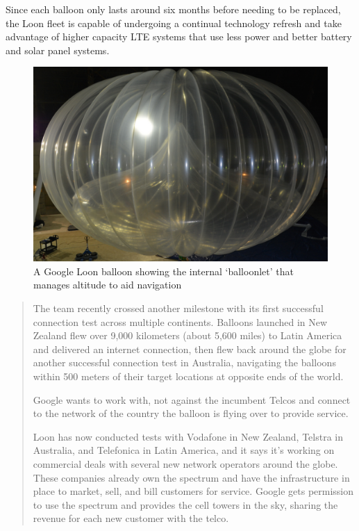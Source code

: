 Since each balloon only lasts around six months before needing to be replaced, the Loon fleet is capable of undergoing a continual technology refresh and take advantage of higher capacity LTE systems that use less power and better battery and solar panel systems.
\begin{figure}[ht]
\centering
\includegraphics[scale=0.25]{figures/merlin.png}
\caption{A Google Loon balloon showing the internal `balloonlet' that manages altitude to aid navigation\cite{RefWorks:360}}
\label{fig:loon}
\end{figure}
\begin{quotation}
The team recently crossed another milestone with its first successful connection test across multiple continents. Balloons launched in New Zealand flew over 9,000 kilometers (about 5,600 miles) to Latin America and delivered an internet connection, then flew back around the globe for another successful connection test in Australia, navigating the balloons within 500 meters of their target locations at opposite ends of the world.

Google wants to work with, not against the incumbent Telcos and connect to the network of the country the balloon is flying over to provide service. 

Loon has now conducted tests with Vodafone in New Zealand, Telstra in Australia, and Telefonica in Latin America, and it says it’s working on commercial deals with several new network operators around the globe. These companies already own the spectrum and have the infrastructure in place to market, sell, and bill customers for service. Google gets permission to use the spectrum and provides the cell towers in the sky, sharing the revenue for each new customer with the telco.
\end{quotation}

